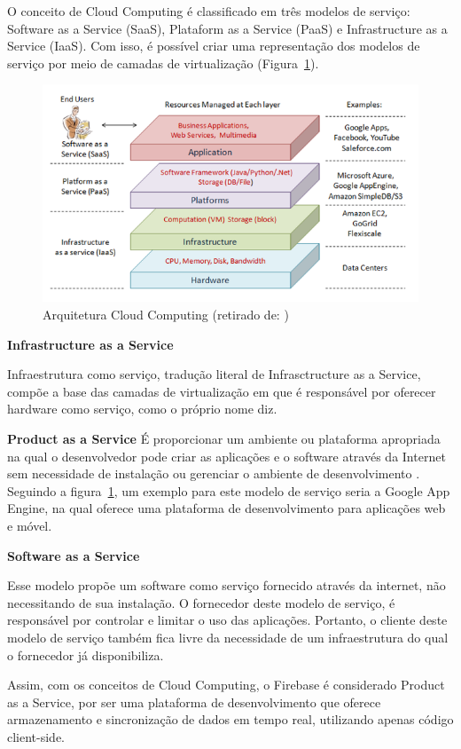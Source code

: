 \documentclass[12pt]{article}
\begin{document}
O conceito de Cloud Computing é classificado em três modelos de serviço: Software as a Service (SaaS), Plataform as a Service (PaaS) e Infrastructure as a Service (IaaS). Com isso, é possível criar uma representação dos modelos de serviço por meio de camadas de virtualização (Figura~\ref{fig:architeture}).

\begin{figure}[ht]
\centering
\includegraphics[width=.9\textwidth]{architeture.png}
\caption{Arquitetura Cloud Computing (retirado de: \cite{2})}
\label{fig:architeture}
\end{figure}

\textbf{Infrastructure as a Service}

Infraestrutura como serviço, tradução literal de Infrasctructure as a Service, compõe a base das camadas de virtualização em que é responsável por oferecer hardware como serviço, como o próprio nome diz.

\textbf{Product as a Service}
É proporcionar um ambiente ou plataforma apropriada na qual o
desenvolvedor pode criar as aplicações e o software através da Internet sem necessidade de instalação ou gerenciar o ambiente de desenvolvimento \cite{1}. Seguindo a figura~\ref{fig:architeture}, um exemplo para este modelo de serviço seria a Google App Engine, na qual oferece uma plataforma de desenvolvimento para aplicações web e móvel.

\textbf{Software as a Service}

Esse modelo propõe um software como serviço fornecido através da internet, não necessitando de sua instalação. O fornecedor deste modelo de serviço, é responsável por controlar e limitar o uso das aplicações. Portanto, o cliente deste modelo de serviço também fica livre da necessidade de um infraestrutura do qual o fornecedor já disponibiliza.

Assim, com os conceitos de Cloud Computing, o Firebase é considerado Product as a Service, por ser uma plataforma de desenvolvimento que oferece armazenamento e sincronização de dados em tempo real, utilizando apenas código client-side.
\end{document}

